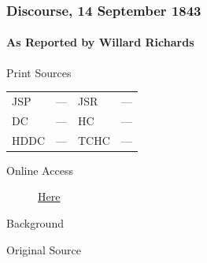 		\subsubsection{Discourse, 14 September 1843}
			\label{EMS-1843-JS-14-SEP-1843}
			
			\paragraph{As Reported by Willard Richards}
				\label{EMS-1843-JS-14-SEP-1843-WR}
			
				\begin{description}
					\item[Print Sources]
				\end{description}

					\begin{tabular}{p{0.5in}p{1in}p{0.5in}p{1in}}
					JSP	 	& ---		& JSR 		& --- \\
					DC	 	& ---		& HC 		& --- \\
					HDDC 	& ---		& TCHC 		& --- \\
					\end{tabular}
				
				\begin{description}
					\item[Online Access] \href{https://www.josephsmithpapers.org/paper-summary/discourse-14-september-1843-as-reported-by-willard-richards/1}{Here}
				\end{description}
				
				\begin{description}
					\item[Background]
				\end{description}
				
				
				\begin{description}
					\item[Original Source]
				\end{description}
				
